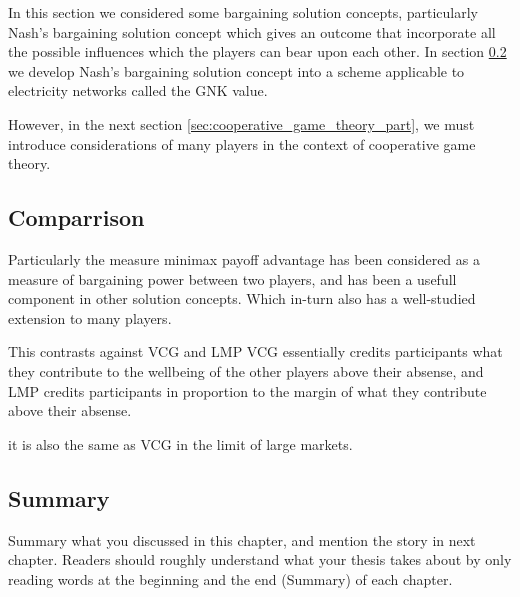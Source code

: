 In this section we considered some bargaining solution concepts, particularly Nash's bargaining solution concept which gives an outcome that incorporate all the possible influences which the players can bear upon each other.
In section \ref{} we develop Nash's bargaining solution concept into a scheme applicable to electricity networks called the GNK value.


However, in the next section \ref{sec:cooperative_game_theory_part}, we must introduce considerations of many players in the context of cooperative game theory.







\subsection{Comparrison}

Particularly the measure minimax payoff advantage has been considered as a measure of bargaining power between two players, and has been a usefull component in other solution concepts.
Which in-turn also has a well-studied extension to many players.\cite{values1,values2,values3}

This contrasts against VCG and LMP
 VCG essentially credits participants what they contribute to the wellbeing of the other players above their absense, and LMP credits participants in proportion to the margin of what they contribute above their absense.

it is also the same as VCG in the limit of large markets.

\subsection{Summary}
Summary what you discussed in this chapter, and mention the story in next
chapter. Readers should roughly understand what your thesis takes about by only reading
words at the beginning and the end (Summary) of each chapter.




